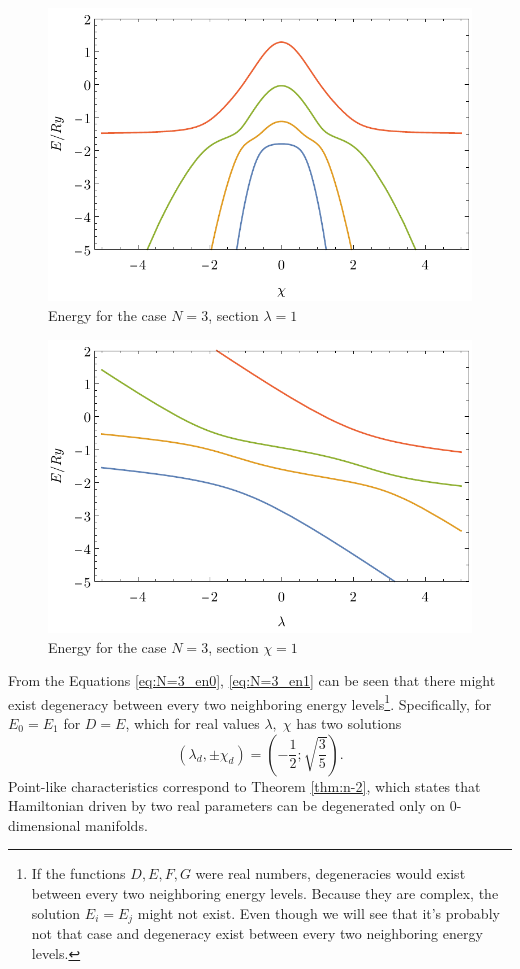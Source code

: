 \begin{figure}[H]
    \centering
    \includegraphics{../img/N=3_energiesl.pdf}
    \caption{Energy for the case $N=3$, section $\lambda=1$}
    \label{fig:N=3_energiesl}
\end{figure}
\begin{figure}[H]
    \centering
    \includegraphics{../img/N=3_energiesc.pdf}
    \caption{Energy for the case $N=3$, section $\chi=1$}
    \label{fig:N=3_energiesc}
\end{figure}

From the Equations \ref{eq:N=3_en0}, \ref{eq:N=3_en1} can be seen that there might exist degeneracy between every two neighboring energy levels\footnote{If the functions $D,E,F,G$ were real numbers, degeneracies would exist between every two neighboring energy levels. Because they are complex, the solution $E_i=E_j$ might not exist. Even though we will see that it's probably not that case and degeneracy exist between every two neighboring energy levels.}. Specifically, for $E_0=E_1$ for $D=E$, which for real values $\lambda,\;\chi$ has two solutions
$$(\lambda_d,\pm \chi_d)=\left(-\frac{1}{2};\sqrt{\frac{3}{5}}\right).$$
Point-like characteristics correspond to Theorem \ref{thm:n-2}, which states that Hamiltonian driven by two real parameters can be degenerated only on 0-dimensional manifolds. 

